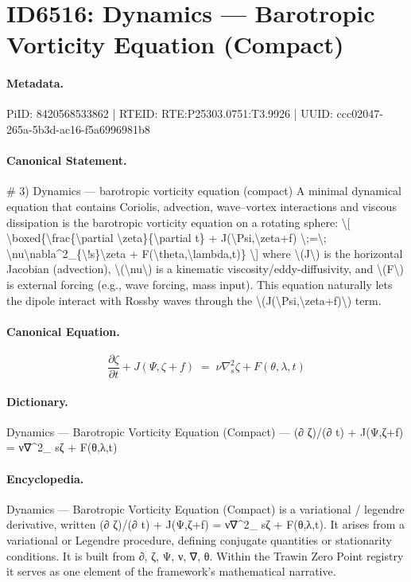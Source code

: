 \section*{ID6516: Dynamics — Barotropic Vorticity Equation (Compact)}
\paragraph{Metadata.}
PiID: 8420568533862 | RTEID: RTE:P25303.0751:T3.9926 | UUID: ccc02047-265a-5b3d-ac16-f5a6996981b8

\paragraph{Canonical Statement.}
\# 3) Dynamics — barotropic vorticity equation (compact) A minimal dynamical equation that contains Coriolis, advection, wave–vortex interactions and viscous dissipation is the barotropic vorticity equation on a rotating sphere: \textbackslash{}[ \textbackslash{}boxed\{\textbackslash{}frac\{\textbackslash{}partial \textbackslash{}zeta\}\{\textbackslash{}partial t\} + J(\textbackslash{}Psi,\textbackslash{}zeta+f) \textbackslash{};=\textbackslash{}; \textbackslash{}nu\textbackslash{}nabla\textasciicircum{}2\_\{\textbackslash{}!s\}\textbackslash{}zeta + F(\textbackslash{}theta,\textbackslash{}lambda,t)\} \textbackslash{}] where \textbackslash{}(J\textbackslash{}) is the horizontal Jacobian (advection), \textbackslash{}(\textbackslash{}nu\textbackslash{}) is a kinematic viscosity/eddy-diffusivity, and \textbackslash{}(F\textbackslash{}) is external forcing (e.g., wave forcing, mass input). This equation naturally lets the dipole interact with Rossby waves through the \textbackslash{}(J(\textbackslash{}Psi,\textbackslash{}zeta+f)\textbackslash{}) term.

\paragraph{Canonical Equation.}
\[
\boxed{\frac{\partial \zeta}{\partial t} + J(\Psi,\zeta+f) \;=\; \nu\nabla^2_{\!s}\zeta + F(\theta,\lambda,t)}
\]

\paragraph{Dictionary.}
Dynamics — Barotropic Vorticity Equation (Compact) — (∂ ζ)/(∂ t) + J(Ψ,ζ+f) = ν∇\textasciicircum{}2\_ sζ + F(θ,λ,t)

\paragraph{Encyclopedia.}
Dynamics — Barotropic Vorticity Equation (Compact) is a variational / legendre derivative, written (∂ ζ)/(∂ t) + J(Ψ,ζ+f) = ν∇\textasciicircum{}2\_ sζ + F(θ,λ,t). It arises from a variational or Legendre procedure, defining conjugate quantities or stationarity conditions. It is built from ∂, ζ, Ψ, ν, ∇, θ. Within the Trawin Zero Point registry it serves as one element of the framework's mathematical narrative.
